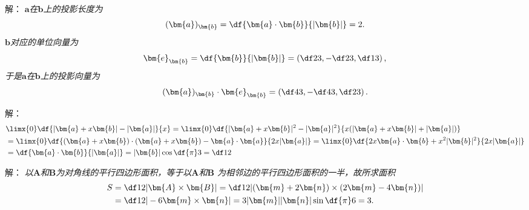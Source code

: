 \begin{frame}
	\linespread{1.5}
	
	
	\small 解：\it
	$\bm{a}$在$\bm{b}$上的投影长度为
	$$(\bm{a})_{\bm{b}}=\df{\bm{a}\cdot\bm{b}}{|\bm{b}|}
	=2.$$
	$\bm{b}$对应的单位向量为
	$$\bm{e}_{\bm{b}}=\df{\bm{b}}{|\bm{b}|}=\left(\df23,-\df23,\df13\right),$$
	于是$\bm{a}$在$\bm{b}$上的投影向量为
	$$(\bm{a})_{\bm{b}}\cdot\bm{e}_{\bm{b}}=\left(\df43,-\df43,\df23\right).$$
	\fin
\end{frame}

\begin{frame}
	\linespread{1.5}
	
	\bigskip
	
	\small 解：\it
	\begin{align*}
		&\limx{0}\df{|\bm{a}+x\bm{b}|-|\bm{a}|}{x}
		=\limx{0}\df{|\bm{a}+x\bm{b}|^2-|\bm{a}|^2}{x(|\bm{a}+x\bm{b}|+|\bm{a}|)}\\
		&=\limx{0}\df{(\bm{a}+x\bm{b})\cdot(\bm{a}+x\bm{b})
		-\bm{a}\cdot\bm{a}}{2x|\bm{a}|}
		=\limx{0}\df{2x\bm{a}\cdot\bm{b}+x^2|\bm{b}|^2}{2x|\bm{a}|}\\
		&=\df{\bm{a}\cdot\bm{b}}{|\bm{a}|}=|\bm{b}|\cos\df{\pi}3=\df12
	\end{align*}
	\fin
	
\end{frame}

\begin{frame}
	\linespread{1.5}
	
	\bigskip
	
	\small 解：\it
	以$\bm{A}$和$\bm{B}$为对角线的平行四边形面积，等于以$\bm{A}$和$\bm{B}$
	为相邻边的平行四边形面积的一半，故所求面积
	\begin{align*}
		S&=\df12{|\bm{A}\times\bm{B}|}
		=\df12|(\bm{m}+2\bm{n})\times(2\bm{m}-4\bm{n})|\\
		&=\df12|-6\bm{m}\times\bm{n}|
		=3|\bm{m}||\bm{n}|\sin\df{\pi}6=3.
	\end{align*}
	\fin
	
\end{frame}

